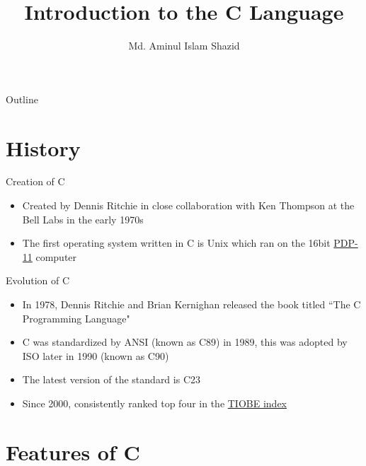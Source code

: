 \documentclass[12pt, aspectratio=169]{beamer}
\title{Introduction to the C Language}
\author{Md. Aminul Islam Shazid}
\date{}
\begin{document}
    {
		\addtocounter{framenumber}{-2}    %

		\begin{frame}
			\titlepage
		\end{frame}

		\begin{frame}{Outline}
            \vfill
			\tableofcontents[subsectionstyle=hide]
            \vfill
		\end{frame}
	}

    \section{History}

    \begin{frame}{Creation of C}
        \begin{itemize}
            \item Created by Dennis Ritchie in close collaboration with Ken Thompson at the Bell Labs in the early 1970s
            \item The first operating system written in C is Unix which ran on the 16bit \href{https://en.wikipedia.org/wiki/PDP-11}{PDP-11} computer
            
        \end{itemize}
    \end{frame}
    
    \begin{frame}{Evolution of C}
        \begin{itemize}
            \item In 1978, Dennis Ritchie and Brian Kernighan released the book titled ``The C Programming Language"
            \item C was standardized by ANSI (known as C89) in 1989, this was adopted by ISO later in 1990 (known as C90)
            \item The latest version of the standard is C23
            \item Since 2000, consistently ranked top four in the \href{https://en.wikipedia.org/wiki/TIOBE_index}{TIOBE index}
        \end{itemize}
    \end{frame}

	\section{Features of C}
	
\end{document}
